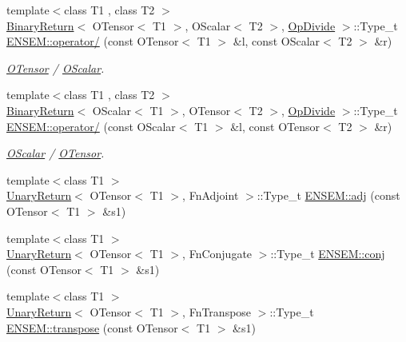 \begin{DoxyCompactItemize}
{\footnotesize template$<$class T1 , class T2 $>$ }\\\mbox{\hyperlink{structBinaryReturn}{Binary\+Return}}$<$ O\+Tensor$<$ T1 $>$, O\+Scalar$<$ T2 $>$, \mbox{\hyperlink{structOpDivide}{Op\+Divide}} $>$\+::Type\+\_\+t \mbox{\hyperlink{group__obstensor_ga5810ade8421abe1d7a6cf07748ac83d3}{E\+N\+S\+E\+M\+::operator/}} (const O\+Tensor$<$ T1 $>$ \&l, const O\+Scalar$<$ T2 $>$ \&r)
\begin{DoxyCompactList}\small\item\em \mbox{\hyperlink{classENSEM_1_1OTensor}{O\+Tensor}} / \mbox{\hyperlink{classENSEM_1_1OScalar}{O\+Scalar}}. \end{DoxyCompactList}\item 
{\footnotesize template$<$class T1 , class T2 $>$ }\\\mbox{\hyperlink{structBinaryReturn}{Binary\+Return}}$<$ O\+Scalar$<$ T1 $>$, O\+Tensor$<$ T2 $>$, \mbox{\hyperlink{structOpDivide}{Op\+Divide}} $>$\+::Type\+\_\+t \mbox{\hyperlink{group__obstensor_ga7a165136688ba38f4500951758f372d3}{E\+N\+S\+E\+M\+::operator/}} (const O\+Scalar$<$ T1 $>$ \&l, const O\+Tensor$<$ T2 $>$ \&r)
\begin{DoxyCompactList}\small\item\em \mbox{\hyperlink{classENSEM_1_1OScalar}{O\+Scalar}} / \mbox{\hyperlink{classENSEM_1_1OTensor}{O\+Tensor}}. \end{DoxyCompactList}\item 
{\footnotesize template$<$class T1 $>$ }\\\mbox{\hyperlink{structUnaryReturn}{Unary\+Return}}$<$ O\+Tensor$<$ T1 $>$, Fn\+Adjoint $>$\+::Type\+\_\+t \mbox{\hyperlink{group__obstensor_ga3c5e5939e51cda2594e94fd03c07ab8b}{E\+N\+S\+E\+M\+::adj}} (const O\+Tensor$<$ T1 $>$ \&s1)
\item 
{\footnotesize template$<$class T1 $>$ }\\\mbox{\hyperlink{structUnaryReturn}{Unary\+Return}}$<$ O\+Tensor$<$ T1 $>$, Fn\+Conjugate $>$\+::Type\+\_\+t \mbox{\hyperlink{group__obstensor_ga53d2641f95a433640eadd4ab33fed1ba}{E\+N\+S\+E\+M\+::conj}} (const O\+Tensor$<$ T1 $>$ \&s1)
\item 
{\footnotesize template$<$class T1 $>$ }\\\mbox{\hyperlink{structUnaryReturn}{Unary\+Return}}$<$ O\+Tensor$<$ T1 $>$, Fn\+Transpose $>$\+::Type\+\_\+t \mbox{\hyperlink{group__obstensor_gad9570a0a6a341ca0e3c9a3f77fd33c3c}{E\+N\+S\+E\+M\+::transpose}} (const O\+Tensor$<$ T1 $>$ \&s1)
\item 

\end{DoxyCompactItemize}
